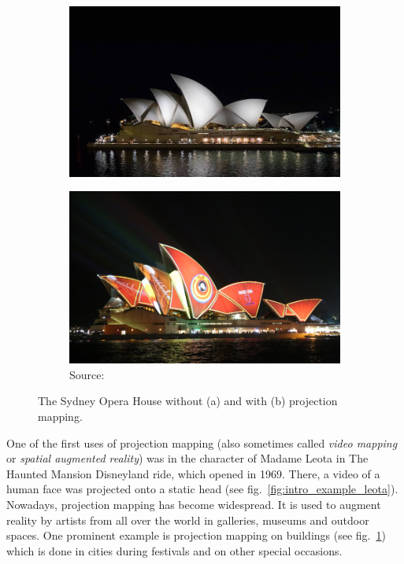 \begin{figure}[ht]
    \centering
    \begin{subfigure}[b]{0.49\textwidth}
        \centering
        \includegraphics[width=\textwidth]{images/01-sydney_opera_house.jpg}
        \caption{}
    \end{subfigure}
    \hfill
    \begin{subfigure}[b]{0.49\textwidth}
        \centering
        \includegraphics[width=\textwidth]{images/01-sydney_opera_house_projection.jpg}
        \caption{Source: \citet{ImageProjectionMappingExampleSydney}}
    \end{subfigure}
    \caption{The Sydney Opera House without (a) and with (b) projection mapping.}
    \label{fig:intro_example_sydney}
\end{figure}

One of the first uses of projection mapping (also sometimes called \textit{video mapping} or \textit{spatial augmented reality}) was in the character of Madame Leota in The Haunted Mansion Disneyland ride, which opened in 1969. There, a video of a human face was projected onto a static head (see fig.~\ref{fig:intro_example_leota}). Nowadays, projection mapping has become widespread. It is used to augment reality by artists from all over the world in galleries, museums and outdoor spaces. One prominent example is projection mapping on buildings (see fig.~\ref{fig:intro_example_sydney}) which is done in cities during festivals and on other special occasions.


